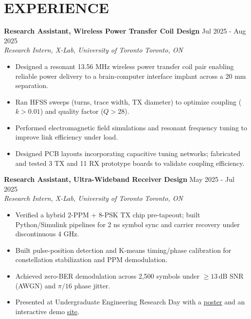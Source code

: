 \documentclass[letterpaper,10pt]{article}
\begin{document}
\section*{\textbf{EXPERIENCE}}

\noindent\textbf{Research Assistant, Wireless Power Transfer Coil Design} \hfill Jul 2025 - Aug 2025\\
\textit{Research Intern, X-Lab, University of Toronto} \hfill \textit{Toronto, ON}
\begin{itemize}[leftmargin=0.2in]
    \item Designed a resonant 13.56 MHz wireless power transfer coil pair enabling reliable power delivery to a brain-computer interface implant across a 20 mm separation.
    \item Ran HFSS sweeps (turns, trace width, TX diameter) to optimize coupling ($k > 0.01$) and quality factor ($Q > 28$).
    \item Performed electromagnetic field simulations and resonant frequency tuning to improve link efficiency under load.
    \item Designed PCB layouts incorporating capacitive tuning networks; fabricated and tested 3 TX and 11 RX prototype boards to validate coupling efficiency.
\end{itemize}

\vspace{0.2cm}
\noindent
\textbf{Research Assistant, Ultra-Wideband Receiver Design} \hfill May 2025 - Jul 2025\\
\textit{Research Intern, X-Lab, University of Toronto} \hfill \textit{Toronto, ON}
\begin{itemize}[leftmargin=0.2in]
    \item Verified a hybrid 2-PPM + 8-PSK TX chip pre-tapeout; built Python/Simulink pipelines for 2 ns symbol sync and carrier recovery under discontinuous 4 GHz.
	\item Built pulse-position detection and K-means timing/phase calibration for constellation stabilization and PPM demodulation.
    \item Achieved zero-BER demodulation across 2,500 symbols under $\geq 13\,\mathrm{dB}$ SNR (AWGN) and $\pi/16$ phase jitter.
    \item Presented at Undergraduate Engineering Research Day with a \href{https://docs.google.com/presentation/d/1h4lmc_HQLzNvtGE4oE1jedOlNVZjL3iztEyGKnC-ico/edit?usp=sharing}{\uline{poster}} and an interactive demo \href{https://github.com/Ken-2511/ppm-psk-visualize}{\uline{site}}.
\end{itemize}
\end{document}
